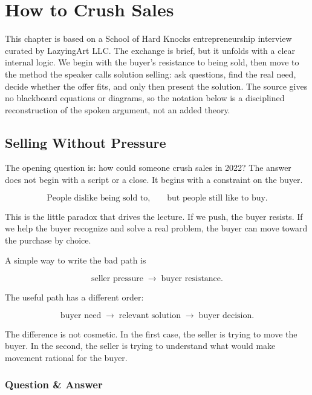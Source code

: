 \chapter{How to Crush Sales}

This chapter is based on a School of Hard Knocks entrepreneurship interview curated by LazyingArt LLC. The exchange is brief, but it unfolds with a clear internal logic. We begin with the buyer's resistance to being sold, then move to the method the speaker calls solution selling: ask questions, find the real need, decide whether the offer fits, and only then present the solution. The source gives no blackboard equations or diagrams, so the notation below is a disciplined reconstruction of the spoken argument, not an added theory.

\section{Selling Without Pressure}

The opening question is: how could someone crush sales in 2022? The answer does not begin with a script or a close. It begins with a constraint on the buyer.

\begin{equation}
\text{People dislike being sold to,}
\qquad
\text{but people still like to buy.}
\end{equation}

This is the little paradox that drives the lecture. If we push, the buyer resists. If we help the buyer recognize and solve a real problem, the buyer can move toward the purchase by choice.

A simple way to write the bad path is

\begin{equation}
\text{seller pressure}
\;\longrightarrow\;
\text{buyer resistance}.
\end{equation}

The useful path has a different order:

\begin{equation}
\text{buyer need}
\;\longrightarrow\;
\text{relevant solution}
\;\longrightarrow\;
\text{buyer decision}.
\end{equation}

The difference is not cosmetic. In the first case, the seller is trying to move the buyer. In the second, the seller is trying to understand what would make movement rational for the buyer.

\subsection{Question \& Answer}

